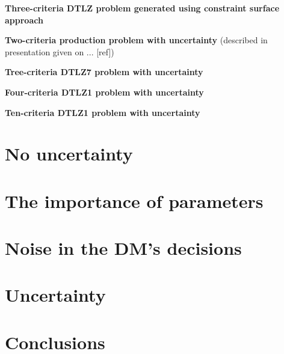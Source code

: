 \begin{description}
  \item{\textbf{Three-criteria DTLZ problem generated using constraint surface
    approach}}

  \item{\textbf{Two-criteria production problem with uncertainty} (described in
    presentation given on ... [ref])}

  \item{\textbf{Tree-criteria DTLZ7 problem with uncertainty}}

  \item{\textbf{Four-criteria DTLZ1 problem with uncertainty}}

  \item{\textbf{Ten-criteria DTLZ1 problem with uncertainty}}

\end{description}

\section{No uncertainty}

\section{The importance of parameters}

\section{Noise in the DM's decisions}

\section{Uncertainty}

\section{Conclusions}

